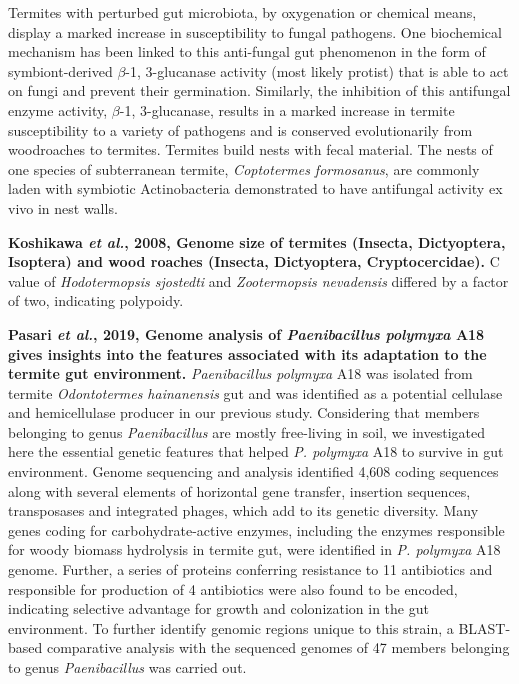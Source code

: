 \documentclass[11pt]{article}
\begin{document}
\begin{sloppypar}
Termites with perturbed gut microbiota, by oxygenation or chemical means, display a marked increase in susceptibility to fungal pathogens. 
One biochemical mechanism has been linked to this anti-fungal gut phenomenon in the form of symbiont-derived $\beta$-1, 3-glucanase activity (most likely protist) that is able to act on fungi and prevent their germination. 
Similarly, the inhibition of this antifungal enzyme activity, $\beta$-1, 3-glucanase, results in a marked increase in termite susceptibility to a variety of pathogens and is conserved evolutionarily from woodroaches to termites. 
Termites build nests with fecal material. 
The nests of one species of subterranean termite, \textit{Coptotermes formosanus}, are commonly laden with symbiotic Actinobacteria demonstrated to have antifungal activity ex vivo in nest walls.
\par
\textbf{Koshikawa \textit{et al.}, 2008, Genome size of termites (Insecta, Dictyoptera, Isoptera) and wood roaches (Insecta, Dictyoptera, Cryptocercidae).} \newline
C value of \textit{Hodotermopsis sjostedti} and \textit{Zootermopsis nevadensis} differed by a factor of two, indicating polypoidy.
\par
\textbf{Pasari \textit{et al.}, 2019, Genome analysis of \textit{Paenibacillus polymyxa} A18 gives insights into the features associated with its adaptation to the termite gut environment.} \newline
\textit{Paenibacillus polymyxa} A18 was isolated from termite \textit{Odontotermes hainanensis} gut and was identified as a potential cellulase and hemicellulase producer in our previous study. 
Considering that members belonging to genus \textit{Paenibacillus} are mostly free-living in soil, we investigated here the essential genetic features that helped \textit{P. polymyxa} A18 to survive in gut environment. 
Genome sequencing and analysis identified 4,608 coding sequences along with several elements of horizontal gene transfer, insertion sequences, transposases and integrated phages, which add to its genetic diversity. 
Many genes coding for carbohydrate-active enzymes, including the enzymes responsible for woody biomass hydrolysis in termite gut, were identified in \textit{P. polymyxa} A18 genome. 
Further, a series of proteins conferring resistance to 11 antibiotics and responsible for production of 4 antibiotics were also found to be encoded, indicating selective advantage for growth and colonization in the gut environment. 
To further identify genomic regions unique to this strain, a BLAST-based comparative analysis with the sequenced genomes of 47 members belonging to genus \textit{Paenibacillus} was carried out. 

\end{sloppypar}
\end{document}
